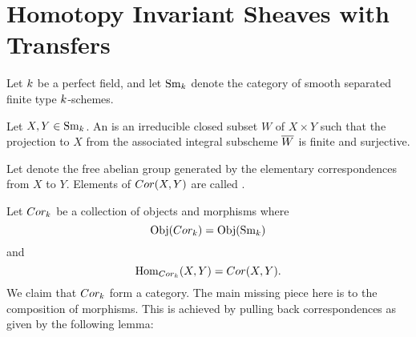 \newpage
\section{Homotopy Invariant Sheaves with Transfers}\label{sect_hist}

Let $k$ be a perfect field, and let $\mathrm{Sm}_{k}$ denote the 
category of smooth separated finite type $k$-schemes.

\begin{defn}\label{def_cor}
Let $X, Y \in \mathrm{Sm}_{k}$. An  is an irreducible closed subset $W$ of $X \times Y$ such that 
the projection to $X$ from the associated integral subscheme 
$\overline{W}$ is finite and surjective.

Let  denote the free abelian group generated by 
the elementary correspondences from $X$ to $Y$. Elements of 
$Cor(X, Y)$ are called .
\end{defn}

Let $Cor_{k}$ be a collection of objects and morphisms 
where 
\[
\mathrm{Obj}(Cor_k) = \mathrm{Obj}(\mathrm{Sm}_{k})
\]
and
\[
\mathrm{Hom}_{Cor_k}(X, Y) = Cor(X, Y).
\]
We claim that $Cor_{k}$ form a category. The main 
missing piece here is to the composition of morphisms. This is 
achieved by pulling back correspondences as given by the following 
lemma:

